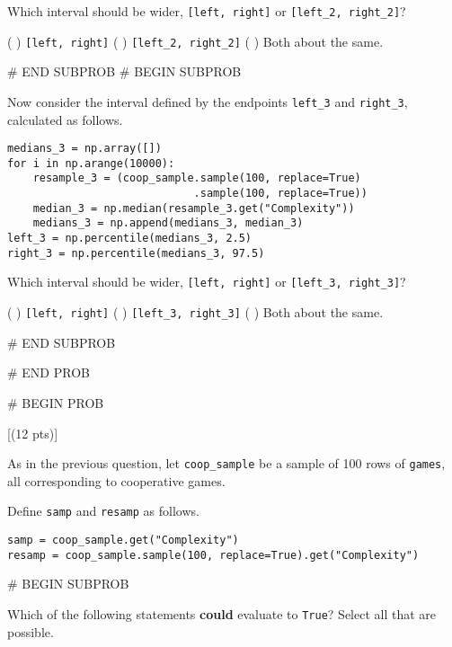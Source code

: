 \documentclass[twoside,12pt]{article}
\begin{document}
        Which interval should be wider, \texttt{[left, right]} or \texttt{[left\_2, right\_2]}?

        \begin{center}
            ( ) \texttt{[left, right]} 
             ( ) \texttt{[left\_2, right\_2]} 
            ( ) Both about the same.
        \end{center}
        
    

# END SUBPROB
    # BEGIN SUBPROB


        Now consider the interval defined by the endpoints \texttt{left\_3} and \texttt{right\_3}, calculated as follows. 

\begin{verbatim}
medians_3 = np.array([])
for i in np.arange(10000):
    resample_3 = (coop_sample.sample(100, replace=True)
                             .sample(100, replace=True))
    median_3 = np.median(resample_3.get("Complexity"))
    medians_3 = np.append(medians_3, median_3)
left_3 = np.percentile(medians_3, 2.5)
right_3 = np.percentile(medians_3, 97.5)
\end{verbatim}

        Which interval should be wider, \texttt{[left, right]} or \texttt{[left\_3, right\_3]}?

        \begin{center}
            ( ) \texttt{[left, right]} 
             ( ) \texttt{[left\_3, right\_3]} 
            ( ) Both about the same.
        \end{center}
              
    

# END SUBPROB



# END PROB

\newpage
# BEGIN PROB

[(12 pts)]

As in the previous question, let \texttt{coop\_sample} be a sample of 100 rows of \texttt{games}, all corresponding to cooperative games.

Define \texttt{samp} and \texttt{resamp} as follows.

\begin{verbatim}
samp = coop_sample.get("Complexity")
resamp = coop_sample.sample(100, replace=True).get("Complexity")
\end{verbatim}


    # BEGIN SUBPROB


        Which of the following statements \textbf{could} evaluate to \texttt{True}? Select all that are possible.
\end{document}
